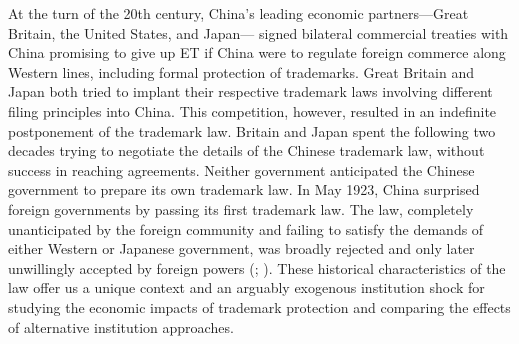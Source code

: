 \documentclass[12pt]{article}
\begin{document}

At the turn of the 20th century, China's leading economic partners---Great Britain, the United States, and Japan--- signed bilateral commercial treaties with China promising to give up ET if China were to regulate foreign commerce along Western lines, including formal protection of trademarks. Great Britain and Japan both tried to  implant their respective trademark laws involving different filing principles into China. This competition, however, resulted in an indefinite postponement of the trademark law. %
Britain and Japan spent the following two decades trying to negotiate the details of the Chinese trademark law, without success in reaching agreements. Neither government anticipated the Chinese government to prepare its own trademark law. In May 1923, China surprised foreign governments by passing its first trademark law. The law, completely unanticipated by the foreign community and failing to satisfy the demands of either Western or Japanese government, was broadly rejected and only later unwillingly accepted by foreign powers (\citealp{Motono2011}; \citealp{PatentTrademarkReview1923}). These historical characteristics of the law offer us a unique context and an arguably exogenous institution shock for studying the economic impacts of trademark protection and comparing the effects of alternative institution approaches. 

\end{document}
